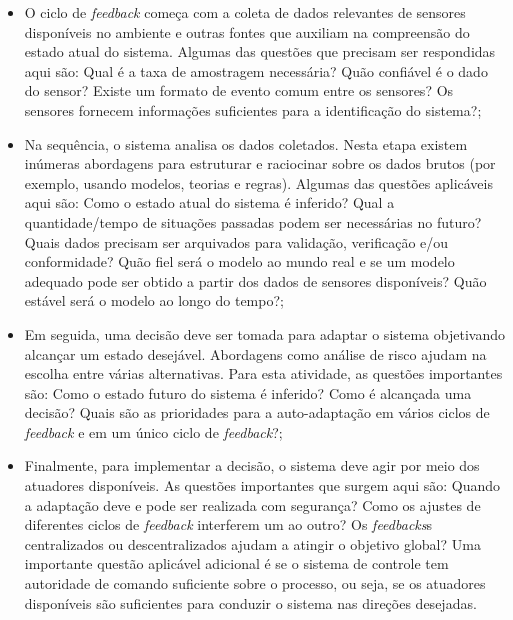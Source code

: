 \documentclass[tid,table]{texufpel} %
\begin{document}
\begin{itemize}

\item O ciclo de \textit{feedback} começa com a coleta de dados relevantes de sensores disponíveis no ambiente e outras fontes que auxiliam na compreensão do estado atual do sistema. Algumas das questões que precisam ser respondidas aqui são: Qual é a taxa de amostragem necessária? Quão confiável é o dado do sensor? Existe um formato de evento comum entre os sensores? Os sensores fornecem informações suficientes para a identificação do sistema?;

\item Na sequência, o sistema analisa os dados coletados. Nesta etapa existem inúmeras abordagens para estruturar e raciocinar sobre os dados brutos (por exemplo, usando modelos, teorias e regras). Algumas das questões aplicáveis aqui são: Como o estado atual do sistema é inferido? Qual a quantidade/tempo de situações passadas podem ser necessárias no futuro? Quais dados precisam ser arquivados para validação, verificação e/ou conformidade? Quão fiel será o modelo ao mundo real e se um modelo adequado pode ser obtido a partir dos dados de sensores disponíveis? Quão estável será o modelo ao longo do tempo?;

\item Em seguida, uma decisão deve ser tomada para adaptar o sistema objetivando alcançar um estado desejável. Abordagens como análise de risco ajudam na escolha entre várias alternativas. Para esta atividade, as questões importantes são: Como o estado futuro do sistema é inferido? Como é alcançada uma decisão? Quais são as prioridades para a auto-adaptação em vários ciclos de \textit{feedback} e em um único ciclo de \textit{feedback}?;

\item Finalmente, para implementar a decisão, o sistema deve agir por meio dos atuadores disponíveis. As questões importantes que surgem aqui são: Quando a adaptação deve e pode ser realizada com segurança? Como os ajustes de diferentes ciclos de \textit{feedback} interferem um ao outro? Os \textit{feedbacks}s centralizados ou descentralizados ajudam a atingir o objetivo global? Uma importante questão aplicável adicional é se o sistema de controle tem autoridade de comando suficiente sobre o processo, ou seja, se os atuadores disponíveis são suficientes para conduzir o sistema nas direções desejadas.

\end{itemize}
\end{document}
